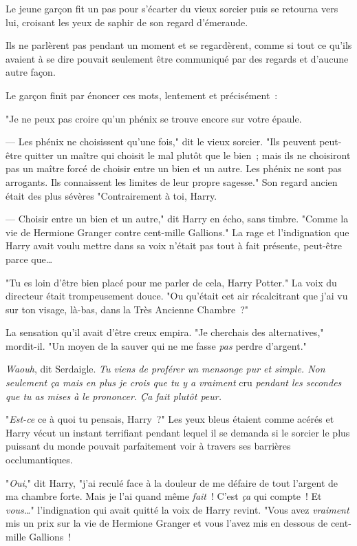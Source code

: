 Le jeune garçon fit un pas pour s'écarter du vieux sorcier puis se retourna vers lui, croisant les yeux de saphir de son regard d'émeraude.

Ils ne parlèrent pas pendant un moment et se regardèrent, comme si tout ce qu'ils avaient à se dire pouvait seulement être communiqué par des regards et d'aucune autre façon.

Le garçon finit par énoncer ces mots, lentement et précisément~:

"Je ne peux pas croire qu'un phénix se trouve encore sur votre épaule.

--- Les phénix ne choisissent qu'une fois," dit le vieux sorcier. "Ils peuvent peut-être quitter un maître qui choisit le mal plutôt que le bien~; mais ils ne choisiront pas un maître forcé de choisir entre un bien et un autre. Les phénix ne sont pas arrogants. Ils connaissent les limites de leur propre sagesse." Son regard ancien était des plus sévères "Contrairement à toi, Harry.

--- Choisir entre un bien et un autre," dit Harry en écho, sans timbre. "Comme la vie de Hermione Granger contre cent-mille Gallions." La rage et l'indignation que Harry avait voulu mettre dans sa voix n'était pas tout à fait présente, peut-être parce que…

"Tu es loin d'être bien placé pour me parler de cela, Harry Potter." La voix du directeur était trompeusement douce. "Ou qu'était cet air récalcitrant que j'ai vu sur ton visage, là-bas, dans la Très Ancienne Chambre~?"

La sensation qu'il avait d'être creux empira. "Je cherchais des alternatives," mordit-il. "Un moyen de la sauver qui ne me fasse \emph{pas} perdre d'argent."

\emph{Waouh}, dit Serdaigle. \emph{Tu viens de proférer un mensonge pur et simple. Non seulement ça mais en plus je crois que tu y a vraiment} cru \emph{pendant les secondes que tu as mises à le prononcer. Ça fait plutôt peur.}

"\emph{Est-ce} ce à quoi tu pensais, Harry~?" Les yeux bleus étaient comme acérés et Harry vécut un instant terrifiant pendant lequel il se demanda si le sorcier le plus puissant du monde pouvait parfaitement voir à travers ses barrières occlumantiques.

"\emph{Oui}," dit Harry, "j'ai reculé face à la douleur de me défaire de tout l'argent de ma chambre forte. Mais je l'ai quand même \emph{fait}~! C'est \emph{ça} qui compte~! Et \emph{vous…}" l'indignation qui avait quitté la voix de Harry revint. "Vous avez \emph{vraiment} mis un prix sur la vie de Hermione Granger et vous l'avez mis en dessous de cent-mille Gallions~!

